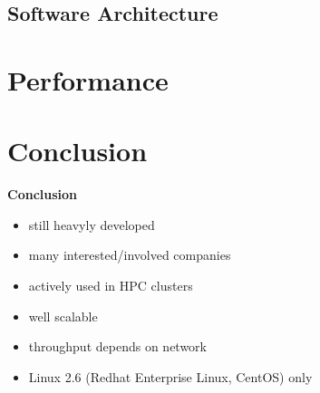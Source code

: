 \documentclass[compress,t,xcolor=dvipsnames]{beamer}
\newcommand{\sectiontoc}{
    \begin{frame}{\textbf{\insertsectionhead}}
        \tableofcontents[current]
    \end{frame}

    \addtocounter{framenumber}{-1}%
}
\begin{document}
\subsection{Software Architecture}
%


\section{Performance}
\sectiontoc
%


\section{Conclusion}
\begin{frame}{\textbf{Conclusion}}
    \begin{itemize}
        \item still heavyly developed
        \item many interested/involved companies
        \item actively used in HPC clusters
        \item well scalable
        \item throughput depends on network
        \item Linux 2.6 (Redhat Enterprise Linux, CentOS) only
    \end{itemize}
\end{frame}

\end{document}
